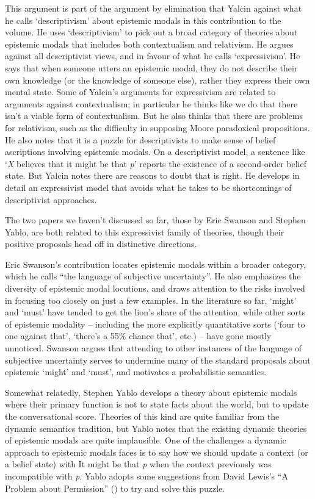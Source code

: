 \documentclass[
  10pt,
  letterpaper,
  DIV=11,
  numbers=noendperiod,
  twoside]{scrartcl}
\begin{document}
This argument is part of the argument by elimination that Yalcin against
what he calls `descriptivism' about epistemic modals in this
contribution to the volume. He uses `descriptivism' to pick out a broad
category of theories about epistemic modals that includes both
contextualism and relativism. He argues against all descriptivist views,
and in favour of what he calls `expressivism'. He says that when someone
utters an epistemic modal, they do not describe their own knowledge (or
the knowledge of someone else), rather they express their own mental
state. Some of Yalcin's arguments for expressivism are related to
arguments against contextualism; in particular he thinks like we do that
there isn't a viable form of contextualism. But he also thinks that
there are problems for relativism, such as the difficulty in supposing
Moore paradoxical propositions. He also notes that it is a puzzle for
descriptivists to make sense of belief ascriptions involving epistemic
modals. On a descriptivist model, a sentence like `\emph{X} believes
that it might be that \emph{p}' reports the existence of a second-order
belief state. But Yalcin notes there are reasons to doubt that is right.
He develops in detail an expressivist model that avoids what he takes to
be shortcomings of descriptivist approaches.

The two papers we haven't discussed so far, those by Eric Swanson and
Stephen Yablo, are both related to this expressivist family of theories,
though their positive proposals head off in distinctive directions.

Eric Swanson's contribution locates epistemic modals within a broader
category, which he calls ``the language of subjective uncertainty''. He
also emphasizes the diversity of epistemic modal locutions, and draws
attention to the risks involved in focusing too closely on just a few
examples. In the literature so far, `might' and `must' have tended to
get the lion's share of the attention, while other sorts of epistemic
modality -- including the more explicitly quantitative sorts (`four to
one against that', `there's a 55\% chance that', etc.) -- have gone
mostly unnoticed. Swanson argues that attending to other instances of
the language of subjective uncertainty serves to undermine many of the
standard proposals about epistemic `might' and `must', and motivates a
probabilistic semantics.

Somewhat relatedly, Stephen Yablo develops a theory about epistemic
modals where their primary function is not to state facts about the
world, but to update the conversational score. Theories of this kind are
quite familiar from the dynamic semantics tradition, but Yablo notes
that the existing dynamic theories of epistemic modals are quite
implausible. One of the challenges a dynamic approach to epistemic
modals faces is to say how we should update a context (or a belief
state) with It might be that \emph{p} when the context previously was
incompatible with \emph{p}. Yablo adopts some suggestions from David
Lewis's ``A Problem about Permission'' () to try and solve this puzzle.
\end{document}
